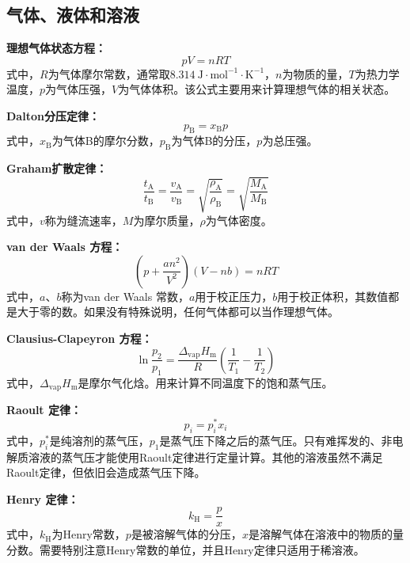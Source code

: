 \documentclass[
  10pt,
  twoside,
  openany,
  b5paper, %
  colorscheme = basic, %
  xits = false,
]{qyxf-book}
\begin{document}
\subsection{气体、液体和溶液}

\textbf{理想气体状态方程：}
	\begin{equation*}
		pV = nRT
	\end{equation*}
式中，$R$为气体摩尔常数，通常取$8.314 \ \mathrm{J\cdot mol^{-1}\cdot K^{-1}}$，$n$为物质的量，$T$为热力学温度，$p$为气体压强，$V$为气体体积。该公式主要用来计算理想气体的相关状态。

\textbf{Dalton分压定律：}
	\begin{equation*}
		p_\mathrm{B} =  x_\mathrm{B} p
	\end{equation*}
式中，$x_\mathrm{B}$为气体B的摩尔分数，$p_\mathrm{B}$为气体B的分压，$p$为总压强。

\textbf{Graham扩散定律：}
	\begin{equation*}
		\frac{t_\mathrm{A}}{t_\mathrm{B}} = 	\frac{v_\mathrm{A}}{v_\mathrm{B}} = 	\sqrt{\frac{\rho_\mathrm{A}}{\rho_\mathrm{B}}} = 
		\sqrt{\frac{M_\mathrm{A}}{M_\mathrm{B}}}
	\end{equation*}
式中，$v$称为缝流速率，$M$为摩尔质量，$\rho$为气体密度。

\textbf{van der Waals 方程：}
	\begin{equation*}
		\left(p+\frac{an^2}{V^2}\right)(V-nb) = nRT
	\end{equation*}
式中，$a$、$b$称为van der Waals 常数，$a$用于校正压力，$b$用于校正体积，其数值都是大于零的数。如果没有特殊说明，任何气体都可以当作理想气体。

\textbf{Clausius-Clapeyron 方程：}
	\begin{equation*}
		\ln \frac{p_2}{p_1} = \frac{\Delta_\mathrm{vap}H_\mathrm{m}}{R} \left(\frac{1}{T_1}-\frac{1}{T_2}\right)
	\end{equation*}
式中，$\Delta_\mathrm{vap}H_\mathrm{m}$是摩尔气化焓。用来计算不同温度下的饱和蒸气压。

\textbf{Raoult 定律：}
	\begin{equation*}
		p_i = p^\ast_i x_i
	\end{equation*}
式中，$p^\ast_i$是纯溶剂的蒸气压，$p_1$是蒸气压下降之后的蒸气压。只有难挥发的、非电解质溶液的蒸气压才能使用Raoult定律进行定量计算。其他的溶液虽然不满足Raoult定律，但依旧会造成蒸气压下降。

\textbf{Henry 定律：}
	\begin{equation*}
		k_\mathrm{H} = \frac{p}{x}
	\end{equation*}
式中，$k_\mathrm{H}$为Henry常数，$p$是被溶解气体的分压，$x$是溶解气体在溶液中的物质的量分数。需要特别注意Henry常数的单位，并且Henry定律只适用于稀溶液。
\end{document}
